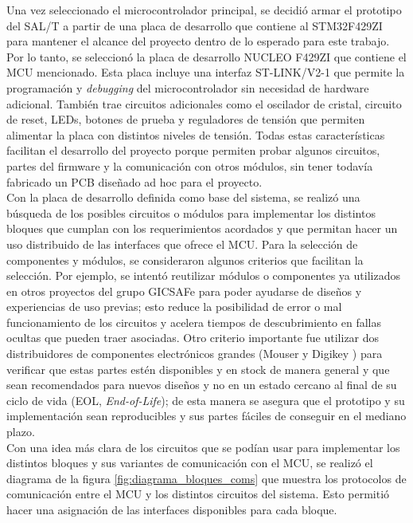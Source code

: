 Una vez seleccionado el microcontrolador principal, se decidió armar el prototipo del SAL/T a partir de una placa de desarrollo que contiene al STM32F429ZI para mantener el alcance del proyecto dentro de lo esperado para este trabajo. Por lo tanto, se seleccionó la placa de desarrollo NUCLEO F429ZI que contiene el MCU mencionado. Esta placa incluye una interfaz ST-LINK/V2-1 que permite la programación y \textit{debugging} del microcontrolador sin necesidad de hardware adicional. También trae circuitos adicionales como el oscilador de cristal, circuito de reset, LEDs, botones de prueba y reguladores de tensión que permiten alimentar la placa con distintos niveles de tensión. Todas estas características facilitan el desarrollo del proyecto porque permiten probar algunos circuitos, partes del firmware y la comunicación con otros módulos, sin tener todavía fabricado un PCB diseñado ad hoc para el proyecto. \\


Con la placa de desarrollo definida como base del sistema, se realizó una búsqueda de los posibles circuitos o módulos para implementar los distintos bloques que cumplan con los requerimientos acordados y que permitan hacer un uso distribuido de las interfaces que ofrece el MCU. Para la selección de componentes y módulos, se consideraron algunos criterios que facilitan la selección. Por ejemplo, se intentó reutilizar módulos o componentes ya utilizados en otros proyectos del grupo GICSAFe para poder ayudarse de diseños y experiencias de uso previas; esto reduce la posibilidad de error o mal funcionamiento de los circuitos y acelera tiempos de descubrimiento en fallas ocultas que pueden traer asociadas. Otro criterio importante fue utilizar dos distribuidores de componentes electrónicos grandes (Mouser \cite{mouser} y Digikey \cite{digikey}) para verificar que estas partes estén disponibles y en stock de manera general y que sean recomendados para nuevos diseños y no en un estado cercano al final de su ciclo de vida (EOL, \textit{End-of-Life}); de esta manera se asegura que el prototipo y su implementación sean reproducibles y sus partes fáciles de conseguir en el mediano plazo. \\

Con una idea más clara de los circuitos que se podían usar para implementar los distintos bloques y sus variantes de comunicación con el MCU, se realizó el diagrama de la figura \ref{fig:diagrama_bloques_coms} que muestra los protocolos de comunicación entre el MCU y los distintos circuitos del sistema. Esto permitió hacer una asignación de las interfaces disponibles para cada bloque. 

